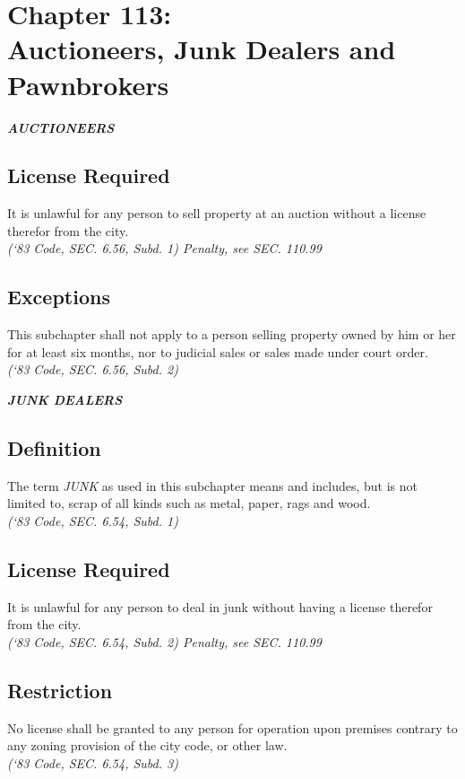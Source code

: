 \chapter*{Chapter 113: \\
	Auctioneers, Junk Dealers and Pawnbrokers}
    \minitoc
    \pagebreak

\begin{center}
    \emph{\textbf{\LARGE{AUCTIONEERS}}}
\end{center}

\section{License Required}
It is unlawful for any person to sell property at an auction without a license therefor from the city.\\
\emph{(‘83 Code, SEC. 6.56, Subd. 1)  Penalty, see SEC. 110.99}
\section{Exceptions}
This subchapter shall not apply to a person selling property owned by him or her for at least six months, nor to judicial sales or sales made under court order.\\
\emph{(‘83 Code, SEC. 6.56, Subd. 2)}

\begin{center}
    \emph{\textbf{\LARGE{JUNK DEALERS}}}
\end{center}

\setcounter{section}{14}
\section{Definition}
The term \emph{JUNK} as used in this subchapter means and includes, but is not limited to, scrap of all kinds such as metal, paper, rags and wood.\\
\emph{(‘83 Code, SEC. 6.54, Subd. 1)}
\section{License Required}
It is unlawful for any person to deal in junk without having a license therefor from the city.\\
\emph{(‘83 Code, SEC. 6.54, Subd. 2)  Penalty, see SEC. 110.99}
\section{Restriction}
No license shall be granted to any person for operation upon premises contrary to any zoning provision of the city code, or other law.\\
\emph{(‘83 Code, SEC. 6.54, Subd. 3)}


